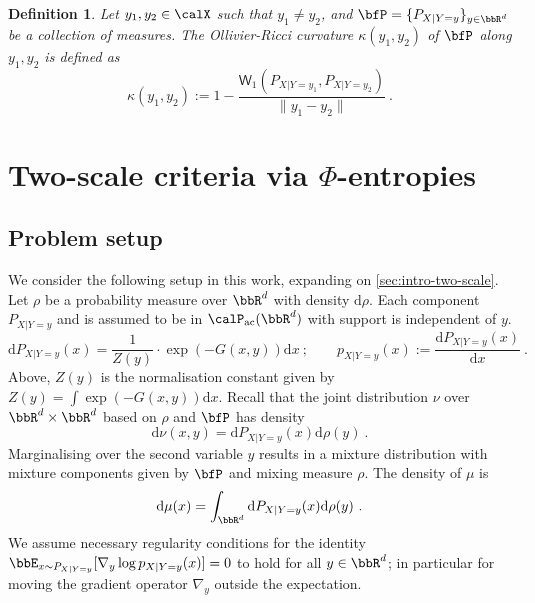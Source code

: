 \documentclass[11pt]{article}
\newtheorem{definition}{Definition}[section]
\newcounter{ct}
\newcommand{\rmd}{\mathrm{d}}
\begin{document}
\begin{definition}
Let \(y_{1}, y_{2} \in \calX\) such that \(y_{1} \neq y_{2}\), and \(\bfP = \{P_{X | Y = y}\}_{y \in \bbR^{d}}\) be a collection of measures.
The Ollivier-Ricci curvature \(\kappa(y_{1}, y_{2})\) of \(\bfP\) along \(y_{1}, y_{2}\) is defined as
\begin{equation*}
    \kappa(y_{1}, y_{2}) := 1 - \frac{\mathsf{W}_{1}\left(P_{X | Y = y_{1}}, P_{X | Y = y_{2}}\right)}{\|y_{1} - y_{2}\|}~.
\end{equation*}
\end{definition}
\section{Two-scale criteria via \(\Phi\)-entropies}
\label{sec:two-scale-criteria}

\subsection{Problem setup}
\label{sec:prob-setup}

We consider the following setup in this work, expanding on \cref{sec:intro-two-scale}.
Let \(\rho\) be a probability measure over \(\bbR^{d}\) with density \(\rmd\rho\).
Each component \(P_{X | Y = y}\) and is assumed to be in \(\calP_{\mathrm{ac}}(\bbR^{d})\) with support is independent of \(y\).
\begin{equation}
\label{eq:kernel-general}
    \rmd P_{X | Y = y}(x) = \frac{1}{Z(y)} \cdot \exp\left(-G(x, y)\right)\rmd x~; \qquad p_{X | Y = y}(x) := \frac{\rmd P_{X | Y = y}(x)}{\rmd x}~.
\end{equation}
Above, \(Z(y)\) is the normalisation constant given by \(Z(y) = \int \exp(-G(x, y)) \rmd x\).
Recall that the joint distribution \(\nu\) over \(\bbR^{d} \times \bbR^{d}\) based on \(\rho\) and \(\bfP\) has density 
\begin{equation}
\label{eq:joint-density}
    \rmd \nu(x, y) = \rmd P_{X | Y = y}(x) \rmd \rho(y)~.
\end{equation}
Marginalising over the second variable \(y\) results in a mixture distribution with mixture components given by \(\bfP\) and mixing measure \(\rho\).
The density of \(\mu\) is
\begin{equation}
\label{eq:mixture-density}
    \rmd\mu(x) = \int_{\bbR^{d}} \rmd P_{X | Y = y}(x) \rmd\rho(y)~.
\end{equation}
We assume necessary regularity conditions for the identity \(\bbE_{x \sim P_{X | Y = y}}[\nabla_{y}\log p_{X | Y = y}(x)] = 0\) to hold for all \(y \in \bbR^{d}\); in particular for moving the gradient operator \(\nabla_{y}\) outside the expectation.
\end{document}
